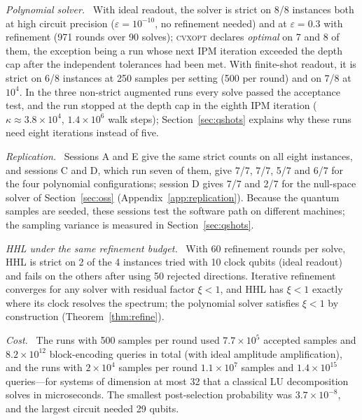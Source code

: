 \documentclass[11pt]{article}
\theoremstyle{definition}
\newcommand{\eps}{\varepsilon}
\newcommand{\lead}[1]{\emph{#1}\ }
\begin{document}
\lead{Polynomial solver.} With ideal readout, the solver is strict on 8/8 instances both at high circuit precision ($\eps=10^{-10}$, no refinement needed) and at $\eps=0.3$ with refinement (971 rounds over 90 solves); \textsc{cvxopt} declares \emph{optimal} on 7 and 8 of them, the exception being a run whose next IPM iteration exceeded the depth cap after the independent tolerances had been met. With finite-shot readout, it is strict on 6/8 instances at 250 samples per setting (500 per round) and on 7/8 at $10^{4}$. In the three non-strict augmented runs every solve passed the acceptance test, and the run stopped at the depth cap in the eighth IPM iteration ($\kappa\approx3.8\times10^{4}$, $1.4\times10^{6}$ walk steps); Section~\ref{sec:qshots} explains why these runs need eight iterations instead of five.

\lead{Replication.} Sessions A and E give the same strict counts on all eight instances, and sessions C and D, which run seven of them, give 7/7, 7/7, 5/7 and 6/7 for the four polynomial configurations; session D gives 7/7 and 2/7 for the null-space solver of Section~\ref{sec:oss} (Appendix~\ref{app:replication}). Because the quantum samples are seeded, these sessions test the software path on different machines; the sampling variance is measured in Section~\ref{sec:qshots}.

\lead{HHL under the same refinement budget.} With 60 refinement rounds per solve, HHL is strict on 2 of the 4 instances tried with 10 clock qubits (ideal readout) and fails on the others after using 50 rejected directions. Iterative refinement converges for any solver with residual factor $\xi<1$, and HHL has $\xi<1$ exactly where its clock resolves the spectrum; the polynomial solver satisfies $\xi<1$ by construction (Theorem~\ref{thm:refine}).

\lead{Cost.} The runs with 500 samples per round used $7.7\times10^{5}$ accepted samples and $8.2\times10^{12}$ block-encoding queries in total (with ideal amplitude amplification), and the runs with $2\times10^{4}$ samples per round $1.1\times10^{7}$ samples and $1.4\times10^{15}$ queries---for systems of dimension at most 32 that a classical LU decomposition solves in microseconds. The smallest post-selection probability was $3.7\times10^{-8}$, and the largest circuit needed 29 qubits.
\end{document}
